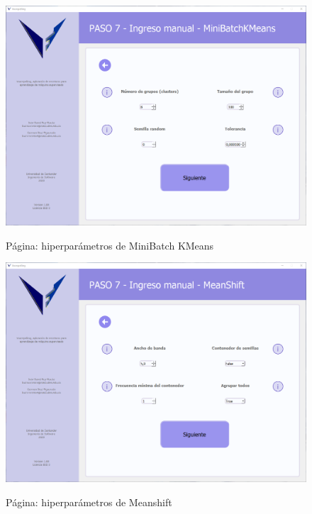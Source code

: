 \begin{figure}[H]
    \centering
    \caption{Página: hiperparámetros de MiniBatch KMeans}
    \includegraphics[width=\textwidth]{views/minibatch_kmeans.png}
    \label{fig:minibatchkmeans}
\end{figure}

\begin{figure}[H]
    \centering
    \caption{Página: hiperparámetros de Meanshift}
    \includegraphics[width=\textwidth]{views/meanshift.png}
    \label{fig:meanshift}
\end{figure}